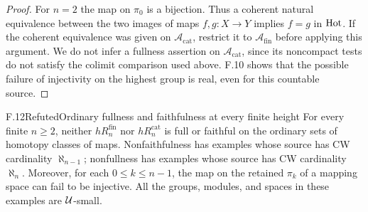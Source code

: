 \begin{proof}
For $n=2$ the map on $\pi_0$ is a bijection. Thus a coherent
natural equivalence between the two images of maps
$f,g:X\to Y$ implies $f=g$ in $\mathrm{Hot}$. If the coherent
equivalence was given on $\mathcal A_{\mathrm{cat}}$, restrict
it to $\mathcal A_{\mathrm{fin}}$ before applying this
argument. We do not infer a fullness assertion on
$\mathcal A_{\mathrm{cat}}$, since its noncompact tests do not
satisfy the colimit comparison used above. F.10 shows that the
possible failure of injectivity on the highest group is real,
even for this countable source.
\end{proof}

\begin{claim}{F.12}{Refuted}{Ordinary fullness and faithfulness at every finite height}
For every finite $n\geq2$, neither $hR_n^{\mathrm{fin}}$ nor
$hR_n^{\mathrm{cat}}$ is full or faithful on the ordinary sets
of homotopy classes of maps. Nonfaithfulness has examples whose
source has CW cardinality $\aleph_{n-1}$; nonfullness has examples
whose source has CW cardinality $\aleph_n$. Moreover, for each
$0\leq k\leq n-1$, the map on the retained $\pi_k$ of a mapping
space can fail to be injective. All the groups, modules, and spaces
in these examples are $\mathcal U$-small.
\end{claim}
